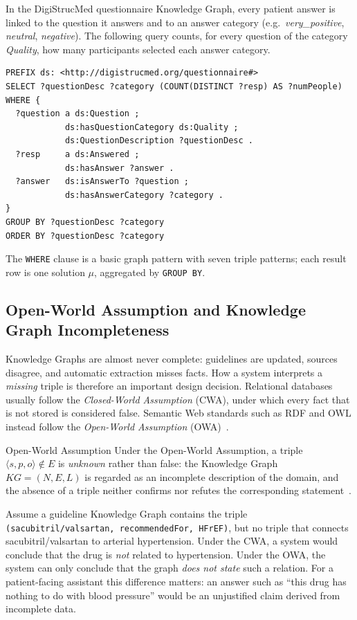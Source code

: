 \begin{bgexample}
In the DigiStrucMed questionnaire Knowledge Graph, every patient answer is
linked to the question it answers and to an answer category (e.g.\
\emph{very\_positive}, \emph{neutral}, \emph{negative}). The following query
counts, for every question of the category \emph{Quality}, how many
participants selected each answer category.
\begin{lstlisting}[style=bgcode]
PREFIX ds: <http://digistrucmed.org/questionnaire#>
SELECT ?questionDesc ?category (COUNT(DISTINCT ?resp) AS ?numPeople)
WHERE {
  ?question a ds:Question ;
            ds:hasQuestionCategory ds:Quality ;
            ds:QuestionDescription ?questionDesc .
  ?resp     a ds:Answered ;
            ds:hasAnswer ?answer .
  ?answer   ds:isAnswerTo ?question ;
            ds:hasAnswerCategory ?category .
}
GROUP BY ?questionDesc ?category
ORDER BY ?questionDesc ?category
\end{lstlisting}
The \texttt{WHERE} clause is a basic graph pattern with seven triple
patterns; each result row is one solution $\mu$, aggregated by
\texttt{GROUP BY}.
\end{bgexample}

\subsection{Open-World Assumption and Knowledge Graph Incompleteness}
\label{sec:bg-owa}

Knowledge Graphs are almost never complete: guidelines are updated, sources
disagree, and automatic extraction misses facts. How a system interprets a
\emph{missing} triple is therefore an important design decision. Relational
databases usually follow the \emph{Closed-World Assumption} (CWA), under
which every fact that is not stored is considered false. Semantic Web
standards such as RDF and OWL instead follow the \emph{Open-World Assumption}
(OWA)~\cite{hogan2021knowledge}.

\begin{bgdefinition}{Open-World Assumption}
Under the Open-World Assumption, a triple $\langle s, p, o\rangle \notin E$
is \emph{unknown} rather than false: the Knowledge Graph
$KG=(N,E,L)$ is regarded as an incomplete description of the domain, and the
absence of a triple neither confirms nor refutes the corresponding
statement~\cite{hogan2021knowledge}.
\end{bgdefinition}

\begin{bgexample}
Assume a guideline Knowledge Graph contains the triple
\texttt{(sacubitril/valsartan, recommendedFor, HFrEF)}, but no triple that
connects sacubitril/valsartan to arterial hypertension. Under the CWA, a system would conclude that
the drug is \emph{not} related to hypertension. Under the OWA, the system can
only conclude that the graph \emph{does not state} such a relation. For a
patient-facing assistant this difference matters: an answer such as
``this drug has nothing to do with blood pressure'' would be an unjustified
claim derived from incomplete data.
\end{bgexample}

